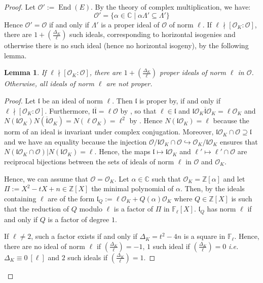 \documentclass[a4paper,10pt]{report}
\theoremstyle{definition}
\theoremstyle{plain}
\newtheorem{lemma}[definition]{Lemma}
\theoremstyle{definition}
\newcommand{\ie}{\emph{i.e.}\ }
\newcommand{\Z}{\mathbb{Z}}
\newcommand{\C}{\mathbb{C}}
\newcommand{\F}{\mathbb{F}}
\newcommand{\mO}{\mathcal{O}}
\renewcommand{\(}{\left(}
\renewcommand{\)}{\right)}
\newcommand{\mf}[1]{\mathfrak{#1}}
\DeclareMathOperator{\End}{End}
\begin{document}
\begin{proof}
Let $\mO':=\End(E)$. By the theory of complex multiplication, we have:
\[\mO'=\{\alpha\in\C\mid \alpha \Lambda'\subseteq\Lambda'\}\]
Hence $\mO'=\mO$ if and only if $\Lambda'$ is a proper ideal of $\mO$ of norm $\ell$.  If $\ell\nmid [\mO_K:\mO]$, there are $1+\(\frac{\Delta_K}{\ell}\)$ such ideals, corresponding to horizontal isogenies and otherwise there is no such ideal (hence no horizontal isogeny), by the following lemma. 

\begin{lemma}\label{lemma 1}
If $\ell\nmid [\mO_K:\mO]$, there are $1+\(\frac{\Delta_K}{\ell}\)$ proper ideals of norm $\ell$ in $\mO$. Otherwise,  all ideals of norm $\ell$ are not proper.
\end{lemma}

\begin{proof}
Let $\mf{l}$ be an ideal of norm $\ell$.  Then $\mf{l}$ is proper by, \cite[lemma 7.18.(ii)]{Cox} if and only if $\ell\nmid [\mO_K:\mO]$.  Furthermore, $\mf{l}\overline{\mf{l}}=\ell\mO$ by \cite[lemma 7.14.(iii)]{Cox}, so that $\ell\in\mf{l}$ and $\mf{l}\mO_K\overline{\mf{l}}\mO_K=\ell\mO_K$ and $N(\mf{l}\mO_K)N(\overline{\mf{l}}\mO_K)=N(\ell\mO_K)=\ell^2$ by \cite[lemma 7.14.(ii)]{Cox}. Hence $N(\mf{l}\mO_K)=\ell$ because the norm of an ideal is invariant under complex conjugation.  Moreover, $\mf{l}\mO_K\cap\mO\supseteq \mf{l}$ and we have an equality because the injection $\mO/\mf{l}\mO_K\cap\mO\hookrightarrow \mO_K/\mf{l}\mO_K$ ensures that $N(\mf{l}\mO_K\cap \mO)|N(\mf{l}\mO_K)=\ell$. Hence, the maps $\mf{l}\longmapsto\mf{l}\mO_K$ and $\mf{\ell'}\longmapsto\mf{\ell'}\cap\mO$ are reciprocal bijections between the sets of ideals of norm $\ell$ in $\mO$ and $\mO_K$.

Hence, we can assume that $\mO=\mO_K$. Let $\alpha\in\C$ such that $\mO_K=\Z[\alpha]$ and let $\Pi:=X^2-tX+n\in\Z[X]$ the minimal polynomial of $\alpha$. Then, by \cite[proposition I.25]{Lang_ANT} the ideals containing $\ell$ are of the form $\mf{l}_Q:=\ell\mO_K+Q(\alpha)\mO_K$ where $Q\in\Z[X]$ is such that the reduction of $Q$ modulo $\ell$ is a factor of $\Pi$ in $\F_\ell[X]$.  $\mf{l}_Q$ has norm $\ell$ if and only if $Q$ is a factor of degree $1$. 

If $\ell\neq 2$, such a factor exists if and only if $\Delta_K=t^2-4n$ is a square in $\F_\ell$. Hence, there are no ideal of norm $\ell$ if $\(\frac{\Delta_K}{\ell}\)=-1$, $1$ such ideal if $\(\frac{\Delta_K}{\ell}\)=0$ \ie $\Delta_K\equiv 0 \ [\ell]$ and $2$ such ideals if $\(\frac{\Delta_K}{\ell}\)=1$. 


\end{proof}
\end{proof}
\end{document}
